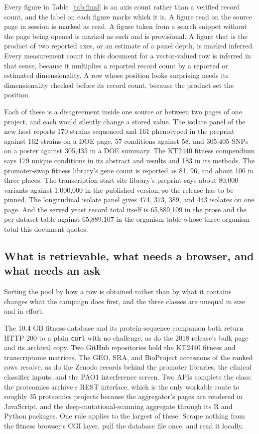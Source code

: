 Every figure in Table~\ref{tab:final} is an axis count rather than a verified record count, and
the label on each figure marks which it is. A figure read on the source page in session is
marked as read. A figure taken from a search snippet without the page being opened is marked as
such and is provisional. A figure that is the product of two reported axes, or an estimate of a
panel depth, is marked inferred. Every measurement count in this document for a vector-valued
row is inferred in that sense, because it multiplies a reported record count by a reported or
estimated dimensionality. A row whose position looks surprising needs its dimensionality
checked before its record count, because the product set the position.

 Each of these is a
disagreement inside one source or between two pages of one project, and each would silently
change a stored value. The isolate panel of the new host reports 170 strains sequenced and 161
phenotyped in the preprint against 162 strains on a DOE page, 57 conditions against 58, and
305,405 SNPs on a poster against 305,435 in a DOE summary. The KT2440 fitness compendium says
179 unique conditions in its abstract and results and 183 in its methods. The promoter-swap
fitness library's gene count is reported as 81, 96, and about 100 in three places. The
transcription-start-site library's preprint says about 80,000 variants against 1,000,000 in the
published version, so the release has to be pinned. The longitudinal isolate panel gives 474,
373, 389, and 443 isolates on one page. And the served yeast record total itself is 65,889,109
in the prose and the per-dataset table against 65,889,107 in the organism table whose
three-organism total this document quotes.

\subsection{What is retrievable, what needs a browser, and what needs an ask}\label{sec:retrieval}

Sorting the pool by how a row is obtained rather than by what it contains changes what the
campaign does first, and the three classes are unequal in size and in effort.

 The 10.4 GB fitness database and its
protein-sequence companion both return HTTP 200 to a plain \texttt{curl} with no challenge, as
do the 2018 release's bulk page and its archival copy. Two GitHub repositories hold the KT2440
fitness and transcriptome matrices. The GEO, SRA, and BioProject accessions of the ranked rows
resolve, as do the Zenodo records behind the promoter libraries, the clinical classifier
inputs, and the PAO1 interference screen. Two APIs complete the class: the proteomics archive's
REST interface, which is the only workable route to roughly 35  proteomics
projects because the aggregator's pages are rendered in JavaScript, and the
deep-mutational-scanning aggregate through its R and Python packages. One rule applies to the
largest of these. Scrape nothing from the fitness browser's CGI layer, pull the database file
once, and read it locally.


